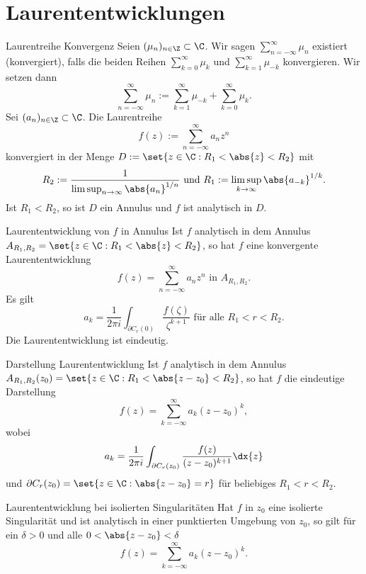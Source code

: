 \section{Laurententwicklungen}

\begin{karte}{Laurentreihe Konvergenz}
    Seien \((\mu_n)_{n\in\Z} \subset \C\). Wir sagen \(\sum_{n=-\infty}^\infty \mu_n\) 
    existiert (konvergiert), falls die beiden Reihen \(\sum_{k=0}^\infty \mu_k\) 
    und \(\sum_{k=1}^\infty \mu_{-k}\) konvergieren. Wir setzen dann 
    \[ \sum_{n=-\infty}^\infty \mu_n := \sum_{k=1}^\infty \mu_{-k} + \sum_{k=0}^\infty \mu_k. \] 
    Sei \((a_n)_{n\in\Z} \subset \C\). Die Laurentreihe 
    \[ f(z) := \sum_{n=-\infty}^\infty a_n z^n \]
    konvergiert in der Menge \(D := \set{z\in \C: R_1 < \abs{z}<R_2}\) mit 
    \[ R_2 := \frac{1}{\limsup_{n\rightarrow \infty} \abs{a_n}^{1/n}} 
    \text{ und } R_1 := \limsup_{k\rightarrow\infty} \abs{a_{-k}}^{1/k}. \]
    Ist \(R_1 < R_2\), so ist \(D\) ein Annulus und \(f\) ist analytisch in \(D\).
\end{karte}

\begin{karte}{Laurententwicklung von \(f\) in Annulus}
    Ist \(f\) analytisch in dem Annulus \(A_{R_1, R_2} = \set{z\in\C: R_1 < \abs{z}<R_2}\), 
    so hat \(f\) eine konvergente Laurententwicklung 
    \[ f(z) = \sum_{n=-\infty}^\infty a_n z^n \text{ in } A_{R_1, R_2}. \]
    Es gilt 
    \[ a_k = \frac{1}{2\pi i} \int_{\partial C_r(0)} \frac{f(\zeta)}{\zeta^{k+1}} 
    \text{ für alle } R_1 < r < R_2. \]
    Die Laurententwicklung ist eindeutig.
\end{karte}

\begin{karte}{Darstellung Laurententwicklung}
    Ist \(f\) analytisch in dem Annulus \(A_{R_1, R_2}(z_0) = \set{z\in \C: R_1 < \abs{z-z_0} < R_2}\), 
    so hat \(f\) die eindeutige Darstellung 
    \[f(z) = \sum_{k=-\infty}^\infty a_k (z-z_0)^k, \]
    wobei \[ a_k = \frac{1}{2\pi i} \int_{\partial C_r(z_0)} \frac{f(z)}{(z-z_0)^{k+1}} \dx{z} \]
    und \(\partial C_r(z_0) = \set{z\in \C: \abs{z-z_0} = r}\) für beliebiges \(R_1 < r < R_2\).
\end{karte}

\begin{karte}{Laurententwicklung bei isolierten Singularitäten}
    Hat \(f\) in \(z_0\) eine isolierte Singularität und ist analytisch in 
    einer punktierten Umgebung von \(z_0\), so gilt für ein \(\delta > 0\) 
    und alle \(0<\abs{z-z_0}<\delta\) 
    \[ f(z) = \sum_{k=-\infty}^\infty a_k (z-z_0)^k. \]
\end{karte}

